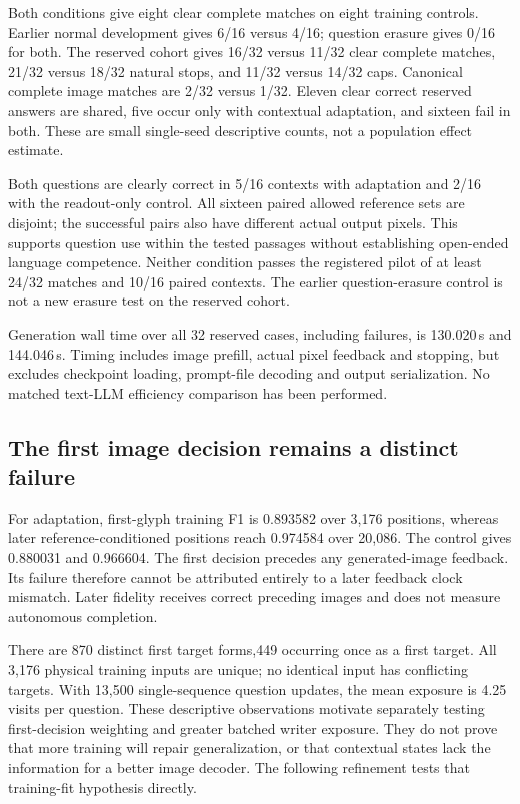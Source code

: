 Both conditions give eight clear complete matches on eight training controls.
Earlier normal development gives 6/16 versus 4/16; question erasure gives 0/16
for both. The reserved cohort gives 16/32 versus 11/32 clear complete matches,
21/32 versus 18/32 natural stops, and 11/32 versus 14/32 caps. Canonical complete
image matches are 2/32 versus 1/32. Eleven clear correct reserved answers are
shared, five occur only with contextual adaptation, and sixteen fail in both.
These are small single-seed descriptive counts, not a population effect estimate.

Both questions are clearly correct in 5/16 contexts with adaptation and 2/16
with the readout-only control. All sixteen paired allowed reference sets are
disjoint; the successful pairs also have different actual output pixels.
This supports question use within the tested passages without establishing
open-ended language competence. Neither condition passes the registered pilot
of at least 24/32 matches and 10/16 paired contexts. The earlier question-erasure
control is not a new erasure test on the reserved cohort.

Generation wall time over all 32 reserved cases, including failures, is
130.020\,s and 144.046\,s. Timing includes image prefill, actual pixel feedback
and stopping, but excludes checkpoint loading, prompt-file decoding and output
serialization. No matched text-LLM efficiency comparison has been performed.

\subsection*{The first image decision remains a distinct failure}
For adaptation, first-glyph training F1 is 0.893582 over 3,176 positions, whereas
later reference-conditioned positions reach 0.974584 over 20,086. The control
gives 0.880031 and 0.966604. The first decision precedes any generated-image
feedback. Its failure therefore cannot be attributed entirely to a later
feedback clock mismatch. Later fidelity receives correct preceding images
and does not measure autonomous completion.

There are 870 distinct first target forms,449 occurring once as a first target.
All 3,176 physical training inputs are unique; no identical input has conflicting
targets. With 13,500 single-sequence question updates, the mean exposure is
4.25 visits per question. These descriptive observations motivate separately
testing first-decision weighting and greater batched writer exposure. They
do not prove that more training will repair generalization, or that contextual
states lack the information for a better image decoder. The following refinement tests that training-fit hypothesis directly.

